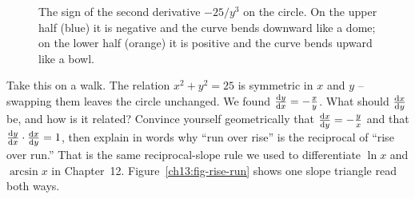 \begin{figure}[htbp]
\centering
{}
\caption{The sign of the second derivative $-25/y^3$ on the circle. On the upper half (blue) it is
negative and the curve bends downward like a dome; on the lower half (orange) it is positive and the
curve bends upward like a bowl.}
\label{ch13:fig-concavity}
\end{figure}

\begin{walkbox}
Take this on a walk. The relation $x^2+y^2=25$ is symmetric in $x$ and $y$ -- swapping them leaves
the circle unchanged. We found $\frac{\mathrm{d} y}{\mathrm{d} x} = -\tfrac{x}{y}$. What should $\frac{\mathrm{d} x}{\mathrm{d} y}$ be, and how is it
related? Convince yourself geometrically that $\frac{\mathrm{d} x}{\mathrm{d} y} = -\tfrac{y}{x}$ and that
$\frac{\mathrm{d} y}{\mathrm{d} x}\cdot\frac{\mathrm{d} x}{\mathrm{d} y} = 1$, then explain in words why ``run over rise'' is the reciprocal of
``rise over run.'' That is the same reciprocal-slope rule we used to differentiate $\ln x$ and $\arcsin x$ in Chapter~12.
Figure~\ref{ch13:fig-rise-run} shows one slope triangle read both ways.
\end{walkbox}

